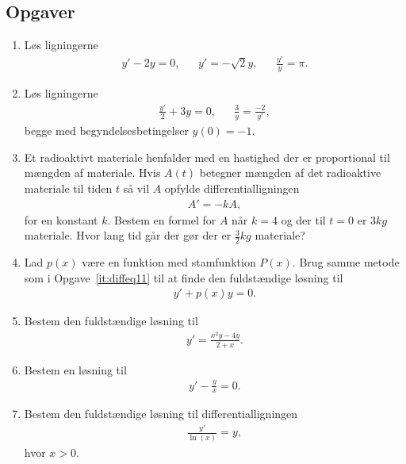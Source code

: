 \subsection{Opgaver}
\begin{enumerate}
	
	\item Løs ligningerne 
	\begin{align*}
	y'-2y=0,&& y'=-\sqrt{2}y,&& \frac{y'}{y}=\pi.
	\end{align*}
	
	
	\item Løs ligningerne 
	\begin{align*}
	\frac{y'}{2}+3y=0,&& \frac{3}{y}=\frac{-2}{y'},
	\end{align*}
	begge med begyndelsesbetingelser $y(0)=-1$.
	

	
	
	
	\item \label{it:diffeq31} Et radioaktivt materiale henfalder med en hastighed der er proportional til mængden af materiale. Hvis $A(t)$ betegner mængden af det radioaktive materiale til tiden $t$ så vil $A$ opfylde differentialligningen
	\begin{align*}
	A'=-kA,
	\end{align*}
	for en konstant $k$. Bestem en formel for $A$ når $k=4$ og der til $t=0$ er $3 kg$ materiale. Hvor lang tid går der gør der er $ \frac{3}{2} kg $ materiale?
	
	
	\item \label{it:diffeq12} Lad $p(x)$ være en funktion med stamfunktion $P(x)$. Brug samme metode som i Opgave~\ref{it:diffeq11} til at finde den fuldstændige løsning til
	\begin{align*}
	y'+p(x)y=0.
	\end{align*}
	
	\item Bestem den fuldstændige løsning til
	\begin{align*}
	y'=\frac{x^2y-4y}{2+x}.
	\end{align*}

	\item Bestem en løsning til
	\begin{align*}
	y'-\frac{y}{x}=0.
	\end{align*}

	\item Bestem den fuldstændige løsning til differentialligningen
	\begin{align*}
	\frac{y'}{\ln(x)}=y,
	\end{align*}
	hvor $x>0$.
	

\end{enumerate}
